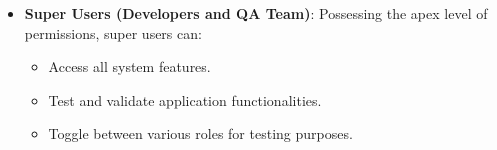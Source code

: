 \begin{itemize}
    \item \textbf{Super Users (Developers and QA Team)}: Possessing the apex level of permissions, super users can:
        \begin{itemize}
            \item Access all system features.
            \item Test and validate application functionalities.
            \item Toggle between various roles for testing purposes.
        \end{itemize}
\end{itemize}
